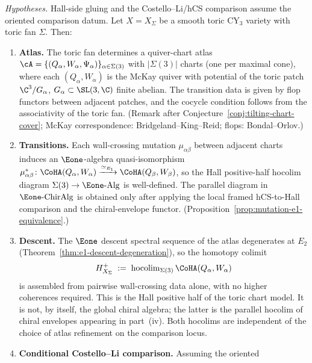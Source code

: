 \begin{theorem}
\label{thm:toric-chart-gluing}
\noindent\emph{Hypotheses.} Hall-side gluing and the Costello--Li/hCS comparison assume the oriented comparison datum.
Let $X = X_\Sigma$ be a smooth toric CY$_3$ variety with toric fan $\Sigma$. Then:
\begin{enumerate}[label=\textup{(\roman*)}]
 \item \textbf{Atlas.} The toric fan determines a quiver-chart atlas $\cA = \{(Q_\alpha, W_\alpha, \Psi_\alpha)\}_{\alpha \in \Sigma(3)}$ with $|\Sigma(3)|$ charts \textup{(}one per maximal cone\textup{)}, where each $(Q_\alpha, W_\alpha)$ is the McKay quiver with potential of the toric patch $\C^3/G_\alpha$, $G_\alpha \subset \SL(3,\C)$ finite abelian. The transition data is given by flop functors between adjacent patches, and the cocycle condition follows from the associativity of the toric fan. \textup{(}Remark after Conjecture~\textup{\ref{conj:tilting-chart-cover}; McKay correspondence: Bridgeland--King--Reid; flops: Bondal--Orlov.)}
 \item \textbf{Transitions.} Each wall-crossing mutation $\mu_{\alpha\beta}$ between adjacent charts induces an $\Eone$-algebra quasi-isomorphism $\mu_{\alpha\beta}^* \colon \CoHA(Q_\alpha, W_\alpha) \xrightarrow{\simeq_{E_1}} \CoHA(Q_\beta, W_\beta)$, so the Hall positive-half hocolim diagram $\Sigma(3) \to \Eone\text{-}\mathrm{Alg}$ is well-defined. The parallel diagram in $\Eone\text{-}\mathrm{ChirAlg}$ is obtained only after applying the local framed hCS-to-Hall comparison and the chiral-envelope functor. \textup{(}Proposition~\textup{\ref{prop:mutation-e1-equivalence}.)}
 \item \textbf{Descent.} The $\Eone$ descent spectral sequence of the atlas degenerates at $E_2$ \textup{(}Theorem~\textup{\ref{thm:e1-descent-degeneration})}, so the homotopy colimit
 \begin{equation}
 \label{eq:toric-global-e1}
 H^+_{X_\Sigma} \;:=\; \operatorname{hocolim}_{\Sigma(3)} \CoHA(Q_\alpha, W_\alpha)
 \end{equation}
 is assembled from pairwise wall-crossing data alone, with no higher coherences required. This is the Hall positive half of the toric chart model. It is not, by itself, the global chiral algebra; the latter is the parallel hocolim of chiral envelopes appearing in part~\textup{(iv)}. Both hocolims are independent of the choice of atlas refinement on the comparison locus.
 \item \textbf{Conditional Costello--Li comparison.} Assuming the oriented

\end{enumerate}
\end{theorem}
